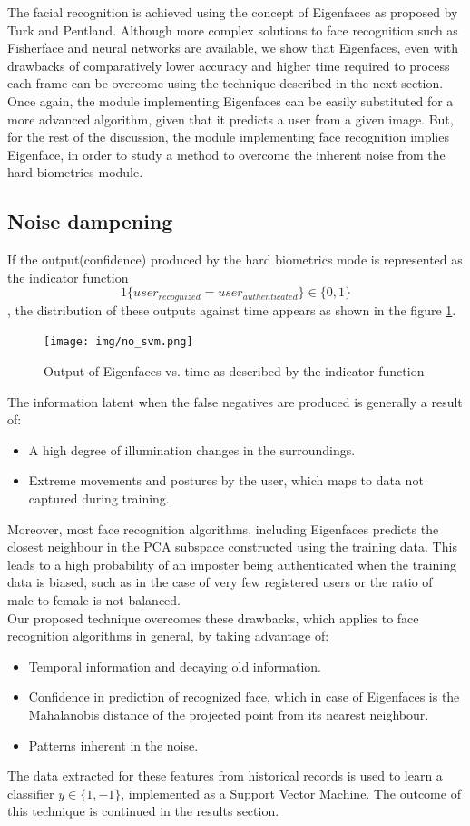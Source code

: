 \documentclass[12pt]{report}			%
\begin{document}
The facial recognition is achieved using the concept of Eigenfaces\cite{Turk91} as proposed by Turk and Pentland.
Although more complex solutions to face recognition such as Fisherface and neural networks are available, we show that Eigenfaces, even with drawbacks of comparatively lower accuracy and higher time required to process each frame can be overcome using the technique described in the next section.
Once again, the module implementing Eigenfaces can be easily substituted for a more advanced algorithm, given that it predicts a user from a given image.
But, for the rest of the discussion, the module implementing face recognition implies Eigenface, in order to study a method to overcome the inherent noise from the hard biometrics module.

\subsection{Noise dampening}
If the output(confidence) produced by the hard biometrics mode is represented as the indicator function
$$ 1\{user_{recognized} = user_{authenticated}\} \in \{0,1\}$$,
the distribution of these outputs against time appears as shown in the figure \ref{fig:no_svm}.
\begin{figure}[h!]
	\centering
	\texttt{[image: img/no\_svm.png]}
	\caption{Output of Eigenfaces vs. time as described by the indicator function}
	\label{fig:no_svm}
\end{figure}
The information latent when the false negatives are produced is generally a result of:
\begin{itemize}
	\item A high degree of illumination changes in the surroundings.
	\item Extreme movements and postures by the user, which maps to data not captured during training.
\end{itemize}
Moreover, most face recognition algorithms, including Eigenfaces predicts the closest neighbour in the PCA subspace constructed using the training data.
This leads to a high probability of an imposter being authenticated when the training data is biased, such as in the case of very few registered users or the ratio of male-to-female is not balanced.\\
Our proposed technique overcomes these drawbacks, which applies to face recognition algorithms in general, by taking advantage of:
\begin{itemize}
	\item Temporal information and decaying old information.
	\item Confidence in prediction of recognized face, which in case of Eigenfaces is the Mahalanobis distance of the projected point from its nearest neighbour.
	\item Patterns inherent in the noise.
\end{itemize}
The data extracted for these features from historical records is used to learn a classifier $y \in \{1,-1\}$, implemented as a Support Vector Machine. The outcome of this technique is continued in the results section.
\end{document}
